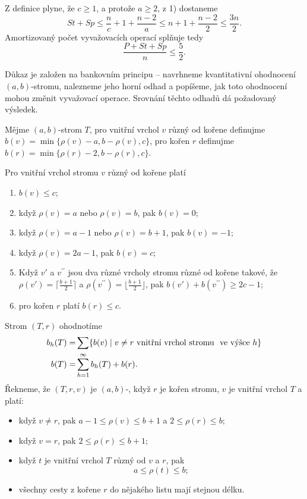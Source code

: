 \documentclass[a4paper,12pt]{article}
\def \emph#1{\underbar{#1}}
\begin{document}
Z definice plyne, že $c\ge 1$, a protože $a\ge 2$, z 1) dostaneme
$$St+Sp\le\frac nc+1+\frac {n-2}a\le n+1+\frac {n-2}2\le\frac {3n}
2.$$
Amortizovaný počet vyvažovacích operací splňuje tedy 
$$\frac {P+St+Sp}n\le\frac 52.$$

Důkaz je založen na bankovním principu -- 
navrhneme kvantitativní ohodnocení $(a,b)$-stromu, 
nalezneme jeho horní odhad a popíšeme, jak 
toto ohodnocení mohou změnit vyvažo\-vací ope\-race. Srovnání 
těchto odhadů dá požadovaný výsledek.

Mějme $(a,b)$-strom $T$, pro vnitřní vrchol 
$v$ různý od kořene definuj\-me 
$b(v)=\min\{\rho (v)-a,b-\rho (v),c\}$, pro 
kořen $r$ definuj\-me $b(r)=\min\{\rho (r)-2,b-\rho (r),c\}$. 

\begin{pozorovani}Pro vnitřní vrchol stromu $v$  
různý od kořene platí
\begin{enumerate}
\item
$b(v)\le c$;
\item
když $\rho (v)=a$ nebo $\rho (v)=b$, pak $b(v)=0$;
\item
když $\rho (v)=a-1$ nebo $\rho (v)=b+1$, pak $b(v)=-1$;
\item
když $\rho (v)=2a-1$, pak $b(v)=c$;
\item
Když $v'$ a $v^{\prime\prime}$ jsou dva různé vrcholy stromu 
různé od kořene takové, že $\rho (v')=\lceil\frac {
b+1}2\rceil$ a 
$\rho (v^{\prime\prime})=\lfloor\frac {b+1}2\rfloor$, pak $b(v')+
b(v^{\prime\prime})\ge 2c-1$;
\item
pro kořen $r$ platí $b(r)\le c$.
\end{enumerate}
\end{pozorovani}

Strom $(T,r)$ ohodnotíme 
\begin{align*} b_h(T)=&\sum \{b(v)\mid v\ne r\text{\rm\ vnitřní vrchol stromu }\text{\rm\ ve výšce }
h\}\\
b(T)=&\sum_{h=1}^{\infty}b_h(T)+b(r).\end{align*}
Řekneme, že $(T,r,v)$ je \emph{parciální} 
$(a,b)$-\emph{strom}, když $r$ je kořen stromu, $v$ je vnitřní 
vrchol $T$ a platí:
\begin{itemize}
\item
když $v\ne r$, pak $a-1\le\rho (v)\le b+1$ a $2\le\rho (r)\le 
b$;
\item
když $v=r$, pak $2\le\rho (r)\le b+1$;
\item
když $t$ je vnitřní vrchol $T$ různý od $v$ a $
r$, pak 
$$a\le\rho (t)\le b;$$
\item
všechny cesty z kořene $r$ do nějakého listu mají stejnou 
délku.
\end{itemize}
\end{document}
